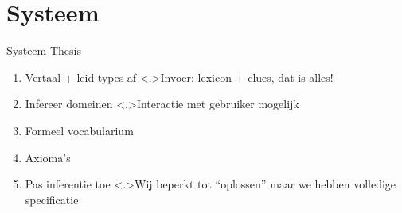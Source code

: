 \documentclass[notes, dvipsnames]{beamer}
\newcommand{\hitem}{
	\ppause
	\item
}
\newcommand{\ppause}{\onslide<+>}
\newcommand{\nnote}[1]{\note<.>{#1}}
\begin{document}
	\section{Systeem}
	\begin{frame}{Systeem Thesis}
		\begin{enumerate}
      \hitem Vertaal + leid types af
      \nnote{Invoer: lexicon + clues, dat is alles!}
      \hitem Infereer domeinen
      \nnote{Interactie met gebruiker mogelijk}
      \hitem Formeel vocabularium
      \hitem Axioma's
      \hitem Pas inferentie toe
      \nnote{Wij beperkt tot ``oplossen'' maar we hebben volledige specificatie}
		\end{enumerate}
	\end{frame}
\end{document}
